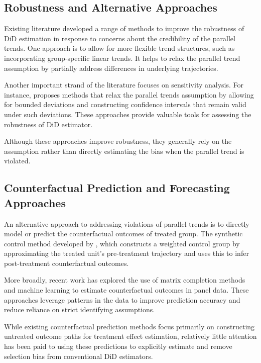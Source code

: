 \documentclass[12pt]{article}
\begin{document}
\subsection{Robustness and Alternative Approaches}

Existing literature developed a range of methods to improve the robustness of DiD estimation in response to concerns about the credibility of the parallel trends. One approach \cite{strezhnev_group-specific_2024} is to allow for more flexible trend structures, such as incorporating group-specific linear trends. It helps to relax the parallel trend assumption by partially address differences in underlying trajectories.

Another important strand of the literature focuses on sensitivity analysis. For instance, \cite{rambachan_more_2023} proposes methods that relax the parallel trends assumption by allowing for bounded deviations and constructing confidence intervals that remain valid under such deviations. These approaches provide valuable tools for assessing the robustness of DiD estimator. 

Although these approaches improve robustness, they generally rely on the assumption rather than directly estimating the bias when the parallel trend is violated.

\subsection{Counterfactual Prediction and Forecasting Approaches}

An alternative approach to addressing violations of parallel trends is to directly model or predict the counterfactual outcomes of treated group. The synthetic control method developed by \cite{abadie_synthetic_2010}, which constructs a weighted control group by approximating the treated unit’s pre-treatment trajectory and uses this to infer post-treatment counterfactual outcomes.

More broadly, recent work \cite{athey_matrix_2021} has explored the use of matrix completion methods and machine learning to estimate counterfactual outcomes in panel data. These approaches leverage patterns in the data to improve prediction accuracy and reduce reliance on strict identifying assumptions.

While existing counterfactual prediction methods focus primarily on constructing untreated outcome paths for treatment effect estimation, relatively little attention has been paid to using these predictions to explicitly estimate and remove selection bias from conventional DiD estimators.
\end{document}
